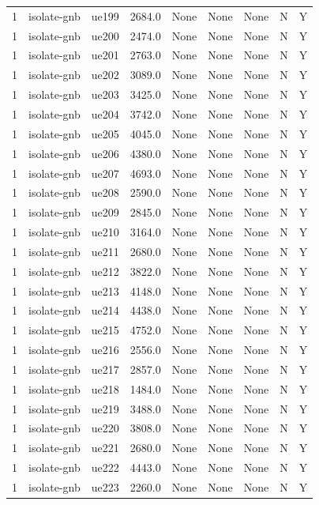 \begin{table}[ht]
\begin{tabular}{|c|c|c|c|c|c|c|c|c|}
1 & isolate-gnb & ue199 & 2684.0 & None & None & None & N & Y \\
1 & isolate-gnb & ue200 & 2474.0 & None & None & None & N & Y \\
1 & isolate-gnb & ue201 & 2763.0 & None & None & None & N & Y \\
1 & isolate-gnb & ue202 & 3089.0 & None & None & None & N & Y \\
1 & isolate-gnb & ue203 & 3425.0 & None & None & None & N & Y \\
1 & isolate-gnb & ue204 & 3742.0 & None & None & None & N & Y \\
1 & isolate-gnb & ue205 & 4045.0 & None & None & None & N & Y \\
1 & isolate-gnb & ue206 & 4380.0 & None & None & None & N & Y \\
1 & isolate-gnb & ue207 & 4693.0 & None & None & None & N & Y \\
1 & isolate-gnb & ue208 & 2590.0 & None & None & None & N & Y \\
1 & isolate-gnb & ue209 & 2845.0 & None & None & None & N & Y \\
1 & isolate-gnb & ue210 & 3164.0 & None & None & None & N & Y \\
1 & isolate-gnb & ue211 & 2680.0 & None & None & None & N & Y \\
1 & isolate-gnb & ue212 & 3822.0 & None & None & None & N & Y \\
1 & isolate-gnb & ue213 & 4148.0 & None & None & None & N & Y \\
1 & isolate-gnb & ue214 & 4438.0 & None & None & None & N & Y \\
1 & isolate-gnb & ue215 & 4752.0 & None & None & None & N & Y \\
1 & isolate-gnb & ue216 & 2556.0 & None & None & None & N & Y \\
1 & isolate-gnb & ue217 & 2857.0 & None & None & None & N & Y \\
1 & isolate-gnb & ue218 & 1484.0 & None & None & None & N & Y \\
1 & isolate-gnb & ue219 & 3488.0 & None & None & None & N & Y \\
1 & isolate-gnb & ue220 & 3808.0 & None & None & None & N & Y \\
1 & isolate-gnb & ue221 & 2680.0 & None & None & None & N & Y \\
1 & isolate-gnb & ue222 & 4443.0 & None & None & None & N & Y \\
1 & isolate-gnb & ue223 & 2260.0 & None & None & None & N & Y \\

\end{tabular}
\end{table}
